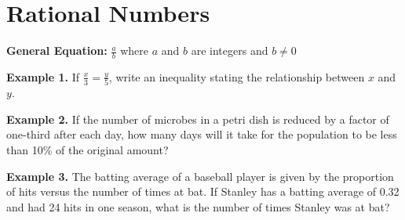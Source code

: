 \documentclass[12pt]{article}
\begin{document}
\section{Rational Numbers}

\bigskip
\textbf{General Equation:} $\frac{a}{b}$ where $a$ and $b$ are integers and $b\neq0$

\vfill
\textbf{Example 1.} If $\frac{x}{3}=\frac{y}{5}$, write an inequality stating the relationship between $x$ and $y$.

\vfill
\textbf{Example 2.} If the number of microbes in a petri dish is reduced by a factor of one-third after each day, how many days will it take for the population to be less than 10\% of the original amount?

\vfill
\textbf{Example 3.} The batting average of a baseball player is given by the proportion of hits versus the number of times at bat. If Stanley has a batting average of 0.32 and had 24 hits in one season, what is the number of times Stanley was at bat?
\end{document}
